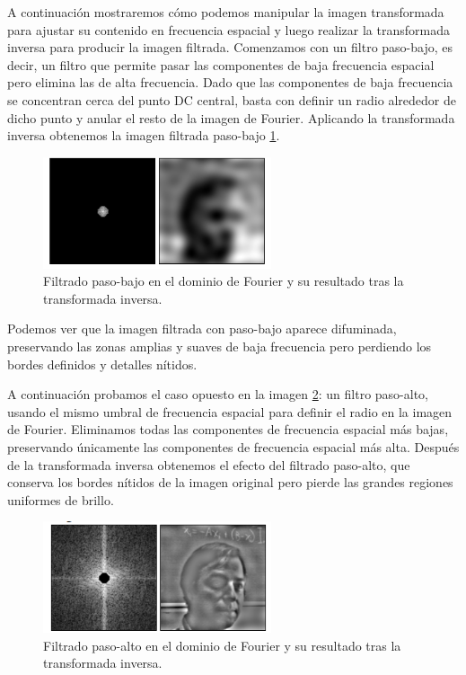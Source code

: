 A continuación mostraremos cómo podemos manipular la imagen transformada para ajustar su contenido en frecuencia espacial y luego realizar la transformada inversa para producir la imagen filtrada. Comenzamos con un filtro paso-bajo, es decir, un filtro que permite pasar las componentes de baja frecuencia espacial pero elimina las de alta frecuencia. Dado que las componentes de baja frecuencia se concentran cerca del punto DC central, basta con definir un radio alrededor de dicho punto y anular el resto de la imagen de Fourier. Aplicando la transformada inversa obtenemos la imagen filtrada paso-bajo \ref{fig:pasabajas}.

\begin{figure}[!htbp]
    \centering
    \includegraphics[width=0.6\textwidth]{img/f6.png}
    \caption{Filtrado paso-bajo en el dominio de Fourier y su resultado tras la transformada inversa. }
    \label{fig:pasabajas}
\end{figure}

Podemos ver que la imagen filtrada con paso-bajo aparece difuminada, preservando las zonas amplias y suaves de baja frecuencia pero perdiendo los bordes definidos y detalles nítidos. 



A continuación probamos el caso opuesto en la imagen \ref{fig:pasaaltas}: un filtro paso-alto, usando el mismo umbral de frecuencia espacial para definir el radio en la imagen de Fourier. Eliminamos todas las componentes de frecuencia espacial más bajas, preservando únicamente las componentes de frecuencia espacial más alta. Después de la transformada inversa obtenemos el efecto del filtrado paso-alto, que conserva los bordes nítidos de la imagen original pero pierde las grandes regiones uniformes de brillo.

\begin{figure}[!htbp]
    \centering
    \includegraphics[width=0.6\textwidth]{img/f7.png}
    \caption{Filtrado paso-alto en el dominio de Fourier y su resultado tras la transformada inversa.}
    \label{fig:pasaaltas}
\end{figure}

